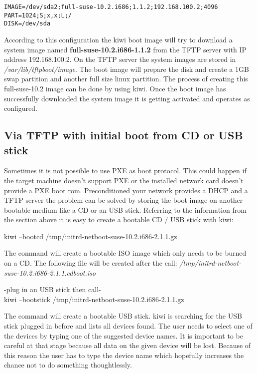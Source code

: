 \begin{verbatim}
IMAGE=/dev/sda2;full-suse-10.2.i686;1.1.2;192.168.100.2;4096
PART=1024;S;x,x;L;/
DISK=/dev/sda
\end{verbatim}

According to this configuration the kiwi boot image will try to download
a system image named \textbf{full-suse-10.2.i686-1.1.2} from
the TFTP server with IP address 192.168.100.2. On the TFTP server the
system images are stored in \textit{/var/lib/tftpboot/image}. The boot
image will prepare the disk and create a 1GB swap partition and another
full size linux partition. The process of creating this full-suse-10.2 image
can be done by using kiwi. Once the boot image has successfully downloaded
the system image it is getting activated and operates as configured. 

\subsection{Via TFTP with initial boot from CD or USB stick}
Sometimes it is not possible to use PXE as boot protocol. This could happen
if the target machine doesn't support PXE or the installed network card
doesn't provide a PXE boot rom. Preconditioned your network provides
a DHCP and a TFTP server the problem can be solved by storing the
boot image on another bootable medium like a CD or an USB stick.
Referring to the information from the section above it is easy to create
a bootable CD / USB stick with kiwi:

\begin{Command}{14cm}
	kiwi --bootcd /tmp/initrd-netboot-suse-10.2.i686-2.1.1.gz
\end{Command}

The command will create a bootable ISO image which only needs to be
burned on a CD. The following file will be created after the call:
\textit{/tmp/initrd-netboot-suse-10.2.i686-2.1.1.cdboot.iso}

\begin{Command}{14cm}
    -plug in an USB stick then call-\\
	kiwi --bootstick /tmp/initrd-netboot-suse-10.2.i686-2.1.1.gz
\end{Command}

The command will create a bootable USB stick. kiwi is searching for
the USB stick plugged in before and lists all devices found. The user
needs to select one of the devices by typing one of the suggested
device names. It is important to be careful at that stage because
all data on the given device will be lost. Because of this reason
the user has to type the device name which hopefully increases the
chance not to do something thoughtlessly.

